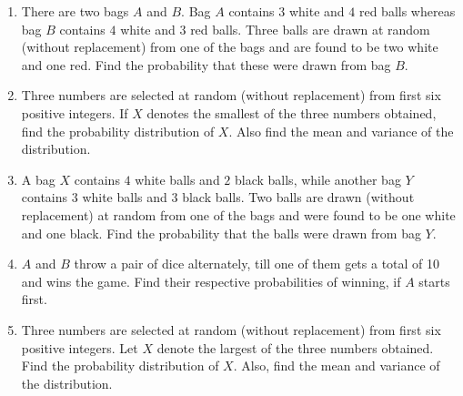\begin{enumerate}
	\item There are two bags $A$ and $B$. Bag $A$ contains $3$ white and $4$ red balls whereas bag $B$ contains $4$ white and $3$ red balls. Three balls are drawn at random (without replacement) from one of the bags and are found to be two white and one red. Find the probability that these were drawn from bag $B$.

	\item Three numbers are selected at random (without replacement) from first six positive integers. If $X$ denotes the smallest of the three numbers obtained, find the probability distribution of $X$. Also find the mean and variance of the distribution.


	\item A bag $X$ contains $4$ white balls and $2$ black balls, while another bag $Y$ contains
$3$ white balls and $3$ black balls. Two balls are drawn (without replacement) at
random from one of the bags and were found to be one white and one black.
Find the probability that the balls were drawn from bag $Y$.

	\item $A$ and $B$ throw a pair of dice alternately, till one of them gets a total of 10 and
wins the game. Find their respective probabilities of winning, if $A$ starts first.

	\item Three numbers are selected at random (without replacement) from first six
positive integers. Let $X$ denote the largest of the three numbers obtained. Find
the probability distribution of $X$. Also, find the mean and variance of the
distribution.
\end{enumerate}
